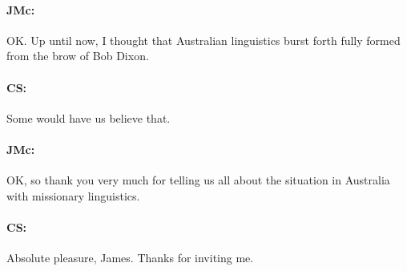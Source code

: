 \documentclass[output=paper]{langscibook}
\begin{document}
\paragraph*{JMc:}  OK. Up until now, I thought that Australian linguistics burst forth fully formed from the brow of Bob Dixon.


\paragraph*{CS:}  Some would have us believe that.


\paragraph*{JMc:}  OK, so thank you very much for telling us all about the situation in Australia with missionary linguistics.


\paragraph*{CS:}  Absolute pleasure, James. Thanks for inviting me.


\nocite{bleek1858a}
\nocite{flierl1880a}
\nocite{gabelentz1861a}
\nocite{grey1839a}
\nocite{grey1841a}
\nocite{grey1845a}
\nocite{kempe1891a}
\nocite{leonhardi1901a}
\nocite{lepsius1855a}
\nocite{lepsius1863a}
\nocite{meyer1843a}
\nocite{mueller1867a}
\nocite{mueller1882a}
\nocite{mueller1854a}
\nocite{pott1884a}
\nocite{prichard1847a}
\nocite{society1885a}
\nocite{schuermann1844a}
\nocite{strehlow1907a}
\nocite{symmons1841a}
\nocite{threlkeld1834a}
\nocite{taplin1879a}
\nocite{dixon2010a}
\nocite{simpson2019a}
\nocite{stockigt2015a}
\nocite{stockigt2017a}
\nocite{stockigt2022a}


\sloppy
\PrintPrimarySources{}
\PrintSecondarySources{}
\end{document}
